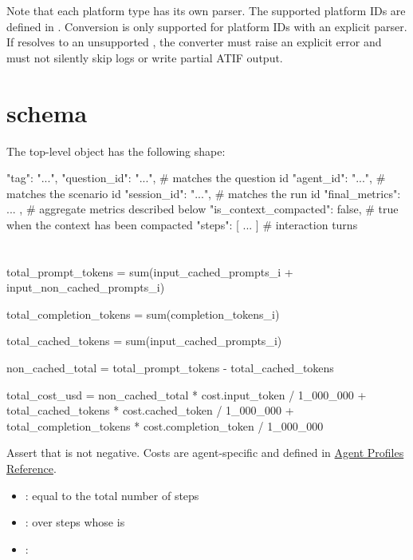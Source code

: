 \documentclass[11pt]{article}
\begin{document}
Note that each platform type has its own parser.
The supported platform IDs are defined in .
Conversion is only supported for platform IDs with an explicit parser.
If  resolves to an unsupported , the converter must raise an explicit error and must not silently skip logs or write partial ATIF output.
\section*{\texorpdfstring{}{atif_trajectory.json} schema}

The top-level object has the following shape:

\begin{DocCode}
{
  "tag": "...",
  "question_id": "...",          # matches the question id
  "agent_id": "...",             # matches the scenario id
  "session_id": "...",           # matches the run id
  "final_metrics": { ... },      # aggregate metrics described below
  "is_context_compacted": false, # true when the context has been compacted
  "steps": [ ... ]               # interaction turns
}
\end{DocCode}


\section*{\texorpdfstring{}{final_metrics}}

\begin{DocCode}
total_prompt_tokens =
  sum(input_cached_prompts_i + input_non_cached_prompts_i)

total_completion_tokens =
  sum(completion_tokens_i)

total_cached_tokens =
  sum(input_cached_prompts_i)

non_cached_total =
  total_prompt_tokens - total_cached_tokens

total_cost_usd =
  non_cached_total * cost.input_token / 1_000_000
  + total_cached_tokens * cost.cached_token / 1_000_000
  + total_completion_tokens * cost.completion_token / 1_000_000
\end{DocCode}

Assert that  is not negative.
Costs are agent-specific and defined in \hyperref[docstart:agent_profiles]{Agent Profiles Reference}.

\begin{itemize}
\item {}: equal to the total number of steps
\item {}:  over steps whose  is 
\item {}: 
\end{itemize}
\end{document}
